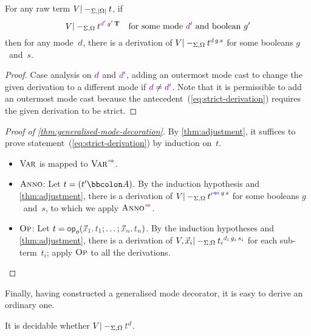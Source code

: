 \begin{lemma}\label{thm:adjustment}
For any raw term $V |-_{\Sigma,\left|\Omega\right|} t$, if
\begin{equation}\label{eq:strict-derivation}
V |-_{\Sigma,\Omega} t^{\dir{d'}\,g'\,\BTrue} \quad\text{for some mode~$\dir{d'}$ and boolean~$g'$}
\end{equation}
then for any mode~$\dir{d}$, there is a derivation of\/ $V |-_{\Sigma,\Omega} t^{\dir{d}\,g\,s}$ for some booleans $g$~and~$s$.
\end{lemma}

\begin{proof}
Case analysis on $\dir{d}$ and $\dir{d'}$, adding an outermost mode cast to change the given derivation to a different mode if $\dir{d} \neq \dir{d'}$.
Note that it is permissible to add an outermost mode cast because the antecedent~(\ref{eq:strict-derivation}) requires the given derivation to be strict.
\end{proof}



\begin{proof}[Proof of \cref{thm:generalised-mode-decoration}]
By \cref{thm:adjustment}, it suffices to prove statement~(\ref{eq:strict-derivation}) by induction on~$t$.

\begin{itemize}
\item $\textnormal{\textsc{Var}}$ is mapped to $\SynRule{Var}$.
\item $\textnormal{\textsc{Anno}}$:
Let $t = (t' \bbcolon A)$.
By the induction hypothesis and \cref{thm:adjustment}, there is a derivation of $V |-_{\Sigma,\Omega} {t'}^{\chk\,g\,s}$ for some booleans $g$~and~$s$, to which we apply $\SynRule{Anno}$.
\item $\textnormal{\textsc{Op}}$:
Let $t = \tmOpts$.
By the induction hypotheses and \cref{thm:adjustment}, there is a derivation of $V, \vec x_i |-_{\Sigma,\Omega} {t_i}^{\dir{d_i}\,g_i\,s_i}$ for each sub-term~$t_i$; apply $\textnormal{\textsc{Op}}$ to all the derivations.
\vspace{-\topsep-\baselineskip}
\end{itemize}
\end{proof}

Finally, having constructed a generalised mode decorator, it is easy to derive an ordinary one.

\begin{corollary}\label{thm:mode-decoration}
  It is decidable whether\/ $V |-_{\Sigma,\Omega} \isTerm{t}^\dir{d}$.%
\end{corollary}

